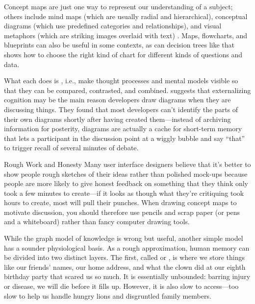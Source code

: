 Concept maps are just one way to represent our understanding of a
subject; others include mind maps (which are usually radial and
hierarchical), conceptual diagrams (which use predefined categories and
relationships), and visual metaphors (which are striking images overlaid
with text) \cite{Eppl2006}. Maps, flowcharts, and blueprints can also
be useful in some contexts, as can decision trees like
\cite{Abel2009} that shows how to choose the right kind of chart for
different kinds of questions and data.

What each does is ,
i.e., make thought processes and mental models visible so that they
can be compared, contrasted, and combined. \cite{Cher2007}
suggests that externalizing cognition may be the main reason
developers draw diagrams when they are discussing things. They found
that most developers can't identify the parts of their own diagrams
shortly after having created them---instead of archiving information
for posterity, diagrams are actually a cache for short-term memory
that lets a participant in the discussion point at a wiggly bubble and
say ``that'' to trigger recall of several minutes of debate.

\begin{aside}{Rough Work and Honesty}
  Many user interface designers believe that it's better to show people
  rough sketches of their ideas rather than polished mock-ups because
  people are more likely to give honest feedback on something that they
  think only took a few minutes to create---if it looks as though what
  they're critiquing took hours to create, most will pull their punches.
  When drawing concept maps to motivate discussion, you should therefore
  use pencils and scrap paper (or pens and a whiteboard) rather than
  fancy computer drawing tools.
\end{aside}


While the graph model of knowledge is wrong but useful, another simple
model has a sounder physiological basis. As a rough approximation,
human memory can be divided into two distinct layers. The first,
called  or , is where we store things like our
friends' names, our home address, and what the clown did at our eighth
birthday party that scared us so much. It is essentially unbounded:
barring injury or disease, we will die before it fills up. However,
it is also slow to access---too slow to help us handle hungry lions
and disgruntled family members.

